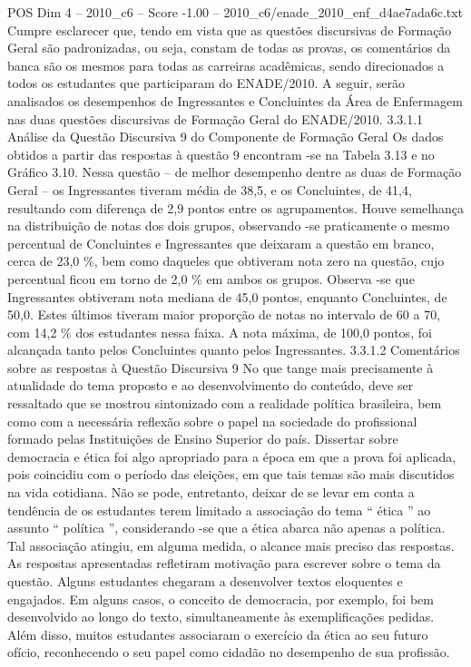 \begin{textsample}{POS Dim 4 – 2010\_c6 – Score -1.00 – 2010\_c6/enade\_2010\_enf\_d4ae7ada6c.txt}
Cumpre esclarecer que, tendo em vista que as questões discursivas de Formação Geral são padronizadas, ou seja, constam de todas as provas, os comentários da banca são os mesmos para todas as carreiras acadêmicas, sendo direcionados a todos os estudantes que participaram do ENADE/2010.
A seguir, serão analisados os desempenhos de Ingressantes e Concluintes da Área de Enfermagem nas duas questões discursivas de Formação Geral do ENADE/2010. 3.3.1.1 Análise da Questão Discursiva 9 do Componente de Formação Geral Os dados obtidos a partir das respostas à questão 9 encontram -se na Tabela 3.13 e no Gráfico 3.10.
Nessa questão – de melhor desempenho dentre as duas de Formação Geral – os Ingressantes tiveram média de 38,5, e os Concluintes, de 41,4, resultando com diferença de 2,9 pontos entre os agrupamentos.
Houve semelhança na distribuição de notas dos dois grupos, observando -se praticamente o mesmo percentual de Concluintes e Ingressantes que deixaram a questão em branco, cerca de 23,0 \%, bem como daqueles que obtiveram nota zero na questão, cujo percentual ficou em torno de 2,0 \% em ambos os grupos.
Observa -se que Ingressantes obtiveram nota mediana de 45,0 pontos, enquanto Concluintes, de 50,0.
Estes últimos tiveram maior proporção de notas no intervalo de 60 a 70, com 14,2 \% dos estudantes nessa faixa.
A nota máxima, de 100,0 pontos, foi alcançada tanto pelos Concluintes quanto pelos Ingressantes. 3.3.1.2 Comentários sobre as respostas à Questão Discursiva 9 No que tange mais precisamente à atualidade do tema proposto e ao desenvolvimento do conteúdo, deve ser ressaltado que se mostrou sintonizado com a realidade política brasileira, bem como com a necessária reflexão sobre o papel na sociedade do profissional formado pelas Instituições de Ensino Superior do país.
Dissertar sobre democracia e ética foi algo apropriado para a época em que a prova foi aplicada, pois coincidiu com o período das eleições, em que tais temas são mais discutidos na vida cotidiana.
Não se pode, entretanto, deixar de se levar em conta a tendência de os estudantes terem limitado a associação do tema “ ética ” ao assunto “ política ”, considerando -se que a ética abarca não apenas a política.
Tal associação atingiu, em alguma medida, o alcance mais preciso das respostas.
As respostas apresentadas refletiram motivação para escrever sobre o tema da questão.
Alguns estudantes chegaram a desenvolver textos eloquentes e engajados.
Em alguns casos, o conceito de democracia, por exemplo, foi bem desenvolvido ao longo do texto, simultaneamente às exemplificações pedidas.
Além disso, muitos estudantes associaram o exercício da ética ao seu futuro ofício, reconhecendo o seu papel como cidadão no desempenho de sua profissão.

\end{textsample}
